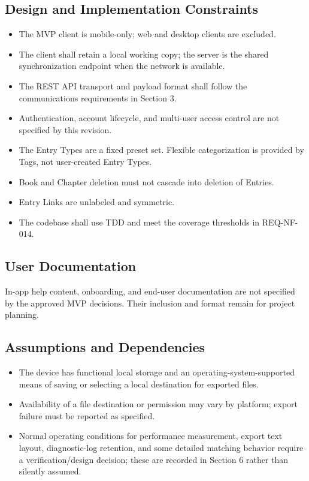 \documentclass[11pt,a4paper]{article}
\begin{document}
\subsection{Design and Implementation Constraints}
\begin{itemize}
  \item The MVP client is mobile-only; web and desktop clients are excluded.
  \item The client shall retain a local working copy; the server is the shared synchronization endpoint when the network is available.
  \item The REST API transport and payload format shall follow the communications requirements in Section 3.
  \item Authentication, account lifecycle, and multi-user access control are not specified by this revision.
  \item The Entry Types are a fixed preset set. Flexible categorization is provided by Tags, not user-created Entry Types.
  \item Book and Chapter deletion must not cascade into deletion of Entries.
  \item Entry Links are unlabeled and symmetric.
  \item The codebase shall use TDD and meet the coverage thresholds in REQ-NF-014.
\end{itemize}

\subsection{User Documentation}
In-app help content, onboarding, and end-user documentation are not specified by the approved MVP decisions. Their inclusion and format remain for project planning.

\subsection{Assumptions and Dependencies}
\begin{itemize}
  \item The device has functional local storage and an operating-system-supported means of saving or selecting a local destination for exported files.
  \item Availability of a file destination or permission may vary by platform; export failure must be reported as specified.
  \item Normal operating conditions for performance measurement, export text layout, diagnostic-log retention, and some detailed matching behavior require a verification/design decision; these are recorded in Section 6 rather than silently assumed.
\end{itemize}
\end{document}
